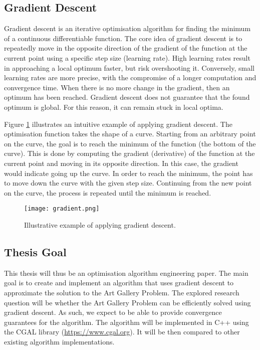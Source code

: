 \newpage
\subsection{Gradient Descent}

Gradient descent is an iterative optimisation algorithm for finding the minimum of a continuous differentiable function. The core idea of gradient descent is to repeatedly move in the opposite direction of the gradient of the function at the current point using a specific step size (learning rate). High learning rates result in approaching a local optimum faster, but risk overshooting it. Conversely, small learning rates are more precise, with the compromise of a longer computation and convergence time.
When there is no more change in the gradient, then an optimum has been reached. Gradient descent does not guarantee that the found optimum is global. For this reason, it can remain stuck in local optima.

Figure \ref{fig:gradient_descent} illustrates an intuitive example of applying gradient descent. The optimisation function takes the shape of a curve. Starting from an arbitrary point on the curve, the goal is to reach the minimum of the function (the bottom of the curve). This is done by computing the gradient (derivative) of the function at the current point and moving in its opposite direction. In this case, the gradient would indicate going up the curve. In order to reach the minimum, the point has to move down the curve with the given step size. Continuing from the new point on the curve, the process is repeated until the minimum is reached.

\begin{figure}[h!]
    \centering
    \texttt{[image: gradient.png]}
    \caption{Illustrative example of applying gradient descent.}
    \label{fig:gradient_descent}
\end{figure}

\subsection{Thesis Goal}

This thesis will thus be an optimisation algorithm engineering paper. The main goal is to create and implement an algorithm that uses gradient descent to approximate the solution to the Art Gallery Problem. The explored research question will be whether the Art Gallery Problem can be efficiently solved using gradient descent. As such, we expect to be able to provide convergence guarantees for the algorithm. The algorithm will be implemented in C++ using the CGAL library (\url{https://www.cgal.org}). It will be then compared to other existing algorithm implementations.

